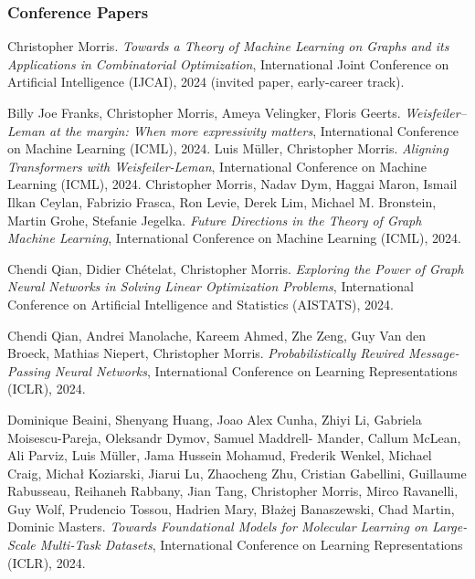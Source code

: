 \documentclass[11pt, a4paper, DIV=14, headings=small]{scrartcl}
\begin{document}
	\begin{thebibliography}{15}
		\subsubsection*{Conference Papers}
		Christopher Morris. \emph{Towards a Theory of Machine Learning on Graphs and its Applications in Combinatorial Optimization}, International Joint Conference on Artificial Intelligence (IJCAI), 2024 (invited paper, early-career track).		
		
		 Billy Joe Franks, Christopher Morris, Ameya Velingker, Floris Geerts. \emph{Weisfeiler–Leman at the margin: When more expressivity matters}, International Conference on Machine Learning (ICML), 2024.
	Luis Müller, Christopher Morris. \emph{Aligning Transformers with Weisfeiler-Leman}, International Conference on Machine Learning (ICML), 2024.
		Christopher Morris, Nadav Dym, Haggai Maron, Ismail Ilkan Ceylan, Fabrizio Frasca, Ron Levie, Derek Lim, Michael M. Bronstein, Martin Grohe, Stefanie Jegelka.
\emph{Future Directions in the Theory of Graph Machine Learning},  International Conference on Machine Learning (ICML), 2024.
		
		Chendi Qian, Didier Chételat, Christopher Morris.
		\emph{Exploring the Power of Graph Neural Networks in Solving Linear Optimization Problems},
		International Conference on Artificial Intelligence and Statistics (AISTATS), 2024.		
		
		Chendi Qian, Andrei Manolache, Kareem Ahmed, Zhe Zeng, Guy Van den Broeck, Mathias Niepert, Christopher Morris.
		\emph{Probabilistically Rewired Message-Passing Neural Networks}, 
		International Conference on Learning Representations (ICLR), 2024.		
		
		Dominique Beaini, Shenyang Huang, Joao Alex Cunha, Zhiyi Li, Gabriela Moisescu-Pareja, Oleksandr Dymov, Samuel Maddrell-	      Mander, Callum McLean, Ali Parviz, Luis Müller, Jama Hussein Mohamud, Frederik Wenkel, Michael Craig, Michał Koziarski, Jiarui Lu, Zhaocheng Zhu, Cristian Gabellini, Guillaume Rabusseau, Reihaneh Rabbany, Jian Tang, Christopher Morris, Mirco Ravanelli, Guy Wolf, Prudencio Tossou, Hadrien Mary, B\l{}a\.z{}ej Banaszewski, Chad Martin, Dominic Masters.
		\emph{Towards Foundational Models for Molecular Learning on Large-Scale Multi-Task Datasets}, 
		International Conference on Learning Representations (ICLR), 2024.
		

\end{thebibliography}
\end{document}
